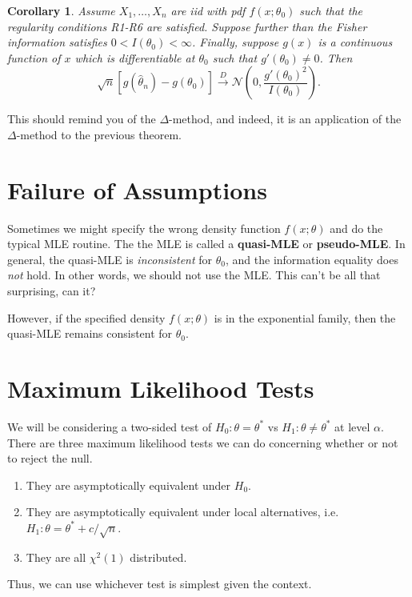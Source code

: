 \documentclass[12pt]{article}
\newcommand{\thetahat}{\hat{\theta}}
\newcommand{\normal}[2]{\mathcal{N} \left({#1}, {#2} \right)}
\newcommand{\cdist}{\overset{D}{\rightarrow}}
\renewcommand{\hat}[1]{\widehat{#1}}
\newtheorem{corollary}{Corollary}
\theoremstyle{definition}
\begin{document}
\begin{corollary}
	Assume $X_1, \hdots, X_n$ are iid with pdf $f(x;\theta_0)$ such that the regularity conditions R1-R6 are satisfied. Suppose further than the Fisher information satisfies $0 < I(\theta_0) < \infty$.  Finally, suppose $g(x)$ is a continuous function of $x$ which is differentiable at $\theta_0$ such that $g'(\theta_0) \neq 0$. Then
	\[	\sqrt{n}\left[ g(\thetahat_n) - g(\theta_0) \right] \cdist \normal{0}{ \frac{g'(\theta_0)^2}{I(\theta_0)} }.	\]	
\end{corollary}
This should remind you of the $\Delta$-method, and indeed, it is an application of the $\Delta$-method to the previous theorem. 




\section{Failure of Assumptions}

Sometimes we might specify the wrong density function $f(x;\theta)$ and do the typical MLE routine. The the MLE is called a \textbf{quasi-MLE} or \textbf{pseudo-MLE}. In general, the quasi-MLE is \emph{inconsistent} for $\theta_0$, and the information equality does \emph{not} hold. In other words, we should not use the MLE. This can't be all that surprising, can it? 

However, if the specified density $f(x;\theta)$ is in the exponential family, then the quasi-MLE remains consistent for $\theta_0$. 




\section{Maximum Likelihood Tests}

We will be considering a two-sided test of $H_0: \theta = \theta^*$ vs $H_1: \theta \neq \theta^*$ at level $\alpha$. There are three maximum likelihood tests we can do concerning whether or not to reject the null.
\begin{enumerate}
	\item  They are asymptotically equivalent under $H_0$.
	\item They are asymptotically equivalent under local alternatives, i.e. $H_1: \theta = \theta^* + c/\sqrt{n}$. 
	\item They are all $\chi^2(1)$ distributed.
\end{enumerate}
Thus, we can use whichever test is simplest given the context. 
\end{document}

